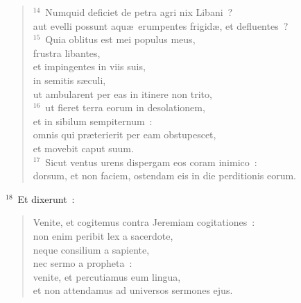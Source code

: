 \begin{verse}
${}^{14}$~Numquid deficiet de petra agri nix Libani~?\\ aut evelli possunt aqu\ae\ erumpentes frigid\ae , et defluentes~?\\
${}^{15}$~Quia oblitus est mei populus meus,\\ frustra libantes,\\ et impingentes in viis suis,\\ in semitis s\ae culi,\\ ut ambularent per eas in itinere non trito,\\
${}^{16}$~ut fieret terra eorum in desolationem,\\ et in sibilum sempiternum~:\\ omnis qui pr\ae terierit per eam obstupescet,\\ et movebit caput suum.\\
${}^{17}$~Sicut ventus urens dispergam eos coram inimico~:\\ dorsum, et non faciem, ostendam eis in die perditionis eorum.\end{verse}


${}^{18}$~Et dixerunt~: \begin{verse}Venite, et cogitemus contra Jeremiam cogitationes~:\\ non enim peribit lex a sacerdote,\\ neque consilium a sapiente,\\ nec sermo a propheta~:\\ venite, et percutiamus eum lingua,\\ et non attendamus ad universos sermones ejus.\end{verse}


